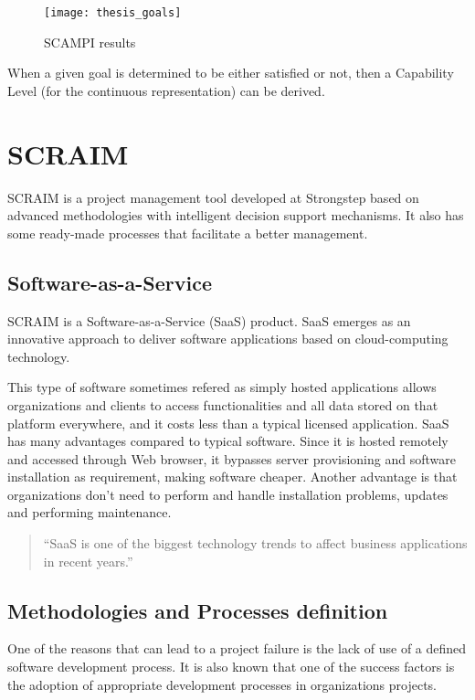 \begin{figure}[h]
	\begin{center}
		\leavevmode
		\texttt{[image: thesis\_goals]}
		\caption{SCAMPI results}
		\label{fig:scampiresults}
	\end{center}
\end{figure}


When a given goal is determined to be either satisfied or not, then a Capability Level (for the continuous representation) can be derived.

\section{SCRAIM}

SCRAIM \citep{SCRAIM} is a project management tool developed at Strongstep based on advanced methodologies with intelligent decision support mechanisms. It also has some ready-made processes that facilitate a better management.

\subsection{Software-as-a-Service}

SCRAIM is a Software-as-a-Service (SaaS) product. SaaS emerges as an innovative
approach to deliver software applications based on cloud-computing
technology. \citep{Chou:2007:ANI:1359479.1359484}

This type of software sometimes refered as simply hosted applications allows organizations and clients to access functionalities and all data stored on that platform everywhere, and it costs less than a typical licensed application. SaaS has many advantages compared to typical software. Since it is hosted remotely and accessed through Web browser, it bypasses server provisioning and software
installation as requirement, making software cheaper. Another advantage is that organizations don't need to perform and handle installation problems, updates and performing maintenance.

\begin{quote}
	``SaaS is one of the biggest technology trends to affect business
	applications in recent years.''~\cite{House2009}
\end{quote}

\subsection{Methodologies and Processes definition}
One of the reasons that can lead to a project failure is the lack of use of a defined software development process. It is also known that one of the success factors is the adoption of appropriate development processes in organizations projects.

